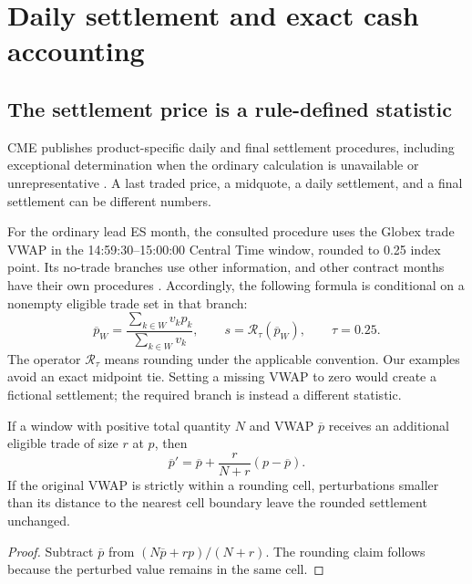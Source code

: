 \section{Daily settlement and exact cash accounting}
\label{sec:settlement}

\subsection{The settlement price is a rule-defined statistic}

CME publishes product-specific daily and final settlement procedures, including exceptional determination when the ordinary calculation is unavailable or unrepresentative \citep{CMESettlements}. A last traded price, a midquote, a daily settlement, and a final settlement can be different numbers.

For the ordinary lead ES month, the consulted procedure uses the Globex trade VWAP in the 14:59:30--15:00:00 Central Time window, rounded to 0.25 index point. Its no-trade branches use other information, and other contract months have their own procedures \citep{CMESettleES}. Accordingly, the following formula is conditional on a nonempty eligible trade set in that branch:
\begin{equation}
 \overline p_W=\frac{\sum_{k\in W}v_kp_k}{\sum_{k\in W}v_k},
 \qquad s=\mathcal R_{\tau}(\overline p_W),\qquad \tau=0.25.
\label{eq:vwap}
\end{equation}
The operator $\mathcal R_\tau$ means rounding under the applicable convention. Our examples avoid an exact midpoint tie. Setting a missing VWAP to zero would create a fictional settlement; the required branch is instead a different statistic.

\begin{proposition}
If a window with positive total quantity $N$ and VWAP $\overline p$ receives an additional eligible trade of size $r$ at $p$, then
\begin{equation}
 \overline p'=\overline p+\frac{r}{N+r}(p-\overline p).
\label{eq:vwapshift}
\end{equation}
If the original VWAP is strictly within a rounding cell, perturbations smaller than its distance to the nearest cell boundary leave the rounded settlement unchanged.
\end{proposition}
\begin{proof}
Subtract $\overline p$ from $(N\overline p+rp)/(N+r)$. The rounding claim follows because the perturbed value remains in the same cell.
\end{proof}

